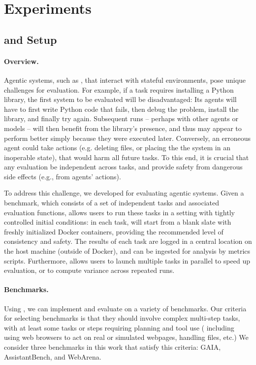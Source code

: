 \section{Experiments}
\label{sec:Experiments}

\subsection{\agbench \xspace and Setup}
\paragraph{Overview.} Agentic systems, such as \team, that interact with stateful environments, pose unique challenges for evaluation. For example, if a task requires installing a Python library, the first system to be evaluated will be disadvantaged: Its agents will have to first write Python code that fails, then debug the problem, install the library, and finally try again. Subsequent runs -- perhaps with other agents or models -- will then benefit from the library's presence, and thus may appear to perform better simply because they were executed later. Conversely, an erroneous agent could take actions (e.g. deleting files, or placing the the system in an inoperable state), that would harm all future tasks. To this end, it is crucial that any evaluation be independent across tasks, and provide safety from dangerous side effects (e.g., from agents' actions).

To address this challenge, we developed \agbench for evaluating agentic systems. Given a benchmark, which consists of a set of independent tasks and associated evaluation functions, \agbench{} allows users to run these tasks in a setting with tightly controlled initial conditions: in each task, \agbench{} will start from a blank slate with freshly initialized Docker containers, providing the recommended level of consistency and safety.
The results of each task are logged in a central location on the host machine (outside of Docker), and can be ingested for analysis by metrics scripts. Furthermore, \agbench{} allows users to launch multiple tasks in parallel to speed up evaluation, or to compute variance across repeated runs. 

\paragraph{Benchmarks.} Using \agbench, we can implement and evaluate \team on a variety of benchmarks. Our criteria for selecting benchmarks is that they should involve complex multi-step tasks, with at least some tasks or steps requiring planning and tool use ( including using web browsers to act on real or simulated webpages, handling files, etc.) We consider three benchmarks in this work that satisfy this criteria: GAIA, AssistantBench, and WebArena.


